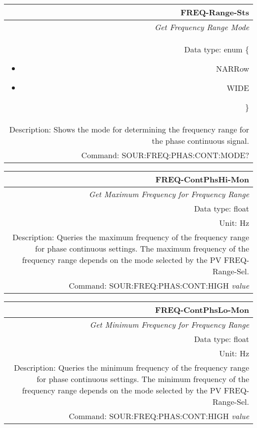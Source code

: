 \documentclass[openany]{article}
\begin{document}
		\begin{tabular}{N}
			\hline
			\bfseries FREQ-Range-Sts \\ \hline
			\emph{Get Frequency Range Mode} \\
			Data type: enum \{\begin{itemize}[noitemsep]
				\small
				\item[] NARRow
				\item[] WIDE
			\end{itemize}\} \\ 
			Description: Shows the mode for determining the frequency range for the phase continuous signal. \\
			Command: SOUR:FREQ:PHAS:CONT:MODE? \\

		\end{tabular}
%
		\begin{tabular}{N}
			\hline
			\bfseries FREQ-ContPhsHi-Mon \\ \hline
			\emph{Get Maximum Frequency for Frequency Range} \\
			Data type: float \\
			Unit: Hz \\
			Description: Queries the maximum frequency of the frequency range for phase continuous settings. The maximum frequency of the frequency range depends on the mode selected by the PV FREQ-Range-Sel.\\
			Command: SOUR:FREQ:PHAS:CONT:HIGH \emph{value} \\
			
		\end{tabular}
%
		\begin{tabular}{N}
			\hline
			\bfseries FREQ-ContPhsLo-Mon \\ \hline
			\emph{Get Minimum Frequency for Frequency Range} \\
			Data type: float \\
			Unit: Hz \\
			Description: Queries the minimum frequency of the frequency range for phase continuous settings. The minimum frequency of the frequency range depends on the mode selected by the PV FREQ-Range-Sel.\\
			Command: SOUR:FREQ:PHAS:CONT:HIGH \emph{value} \\
			
		\end{tabular}
\end{document}
